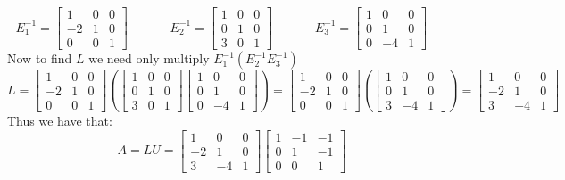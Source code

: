 \documentclass{article}
\begin{document}
$$E_1^{-1}=\begin{bmatrix}
    1 & 0 & 0\\
    -2 & 1 & 0\\
    0 & 0 & 1
\end{bmatrix}\;\;\;\;\;\;\;\;\;\;\;\;
E_2^{-1}=\begin{bmatrix}
    1 & 0 & 0\\
    0 & 1 & 0\\
    3 & 0 & 1
\end{bmatrix}\;\;\;\;\;\;\;\;\;\;\;\;
E_3^{-1} =\begin{bmatrix}
    1 & 0 & 0\\
    0 & 1 & 0\\
    0 & -4 & 1
\end{bmatrix}\;\;\;\;\;\;$$
Now to find $L$ we need only multiply $E_1^{-1}(E_2^{-1}E_3^{-1})$ $$L=\begin{bmatrix}
    1 & 0 & 0\\
    -2 & 1 & 0\\
    0 & 0 & 1
\end{bmatrix}\left(\begin{bmatrix}
    1 & 0 & 0\\
    0 & 1 & 0\\
    3 & 0 & 1
\end{bmatrix}\begin{bmatrix}
    1 & 0 & 0\\
    0 & 1 & 0\\
    0 & -4 & 1
\end{bmatrix}\right)=\begin{bmatrix}
    1 & 0 & 0\\
    -2 & 1 & 0\\
    0 & 0 & 1
\end{bmatrix}\left(\begin{bmatrix}
      1 & 0 & 0\\
    0 & 1 & 0\\
    3 & -4 & 1
\end{bmatrix}\right)=\begin{bmatrix}
      1 & 0 & 0\\
    -2 & 1 & 0\\
    3 & -4 & 1
\end{bmatrix}$$
Thus we have that: $$A=LU=\begin{bmatrix}
      1 & 0 & 0\\
    -2 & 1 & 0\\
    3 & -4 & 1
\end{bmatrix}\begin{bmatrix}
    1&-1&-1\\
    0&1&-1\\
    0&0&1
\end{bmatrix}$$
\newpage
\end{document}
